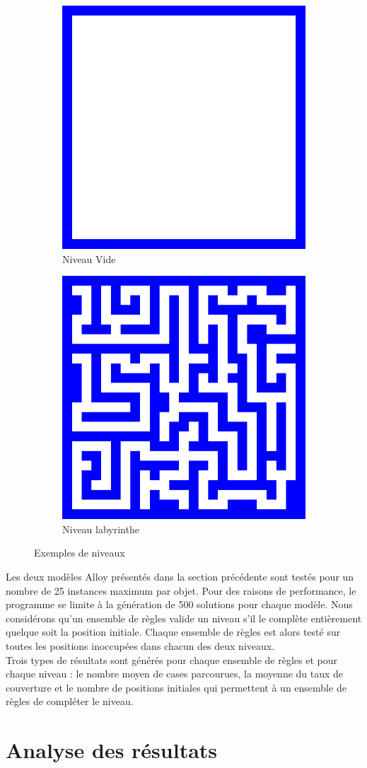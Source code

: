 \documentclass{article}
\begin{document}
\begin{figure}[H]
\centering
\begin{subfigure}{.4\textwidth}
  \centering
  \includegraphics[width=.4\linewidth]{pictures/ImageMap1.png}
  \caption{Niveau Vide}
\end{subfigure}%
\begin{subfigure}{.4\textwidth}
  \centering
  \includegraphics[width=.4\linewidth]{pictures/ImageMap2.png}
  \caption{Niveau labyrinthe}
\end{subfigure}
\caption{Exemples de niveaux}
\end{figure}

Les deux modèles Alloy présentés dans la section précédente sont
testés pour un nombre de 25 instances maximum par objet. Pour des
raisons de performance, le programme se limite à la génération de 500
solutions pour chaque modèle.
\newpage
Nous considérons qu'un ensemble de règles valide un niveau s'il le
complète entièrement quelque soit la position initiale. Chaque
ensemble de règles est alors testé sur toutes les positions inoccupées
dans chacun des deux niveaux.\\

Trois types de résultats sont générés pour chaque ensemble de règles
et pour chaque niveau : le nombre moyen de cases parcourues, la
moyenne du taux de couverture et le nombre de positions initiales qui
permettent à un ensemble de règles de compléter le niveau.

\section{Analyse des résultats}
\label{sec:ana_result}
\end{document}
